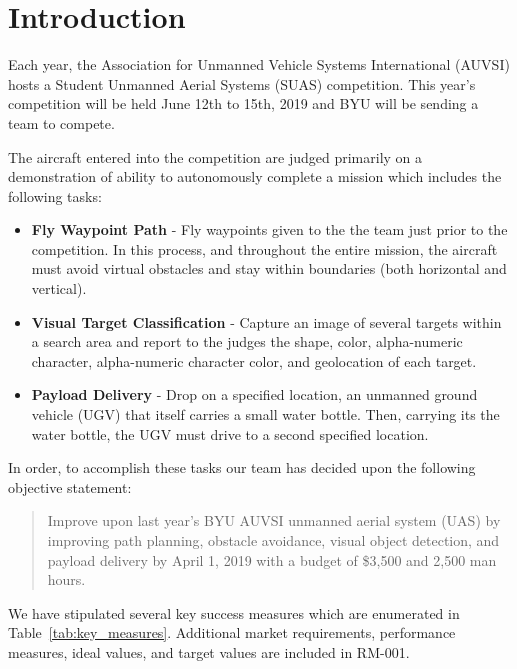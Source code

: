 \documentclass[]{auvsi_doc}
\begin{document}
\begin{AUVSITitlePage}
\begin{artifacttable}
\end{artifacttable}
\end{AUVSITitlePage}


\section{ Introduction}

Each year, the Association for Unmanned Vehicle Systems International (AUVSI) hosts a Student Unmanned Aerial Systems (SUAS) competition. This year’s competition will be held June 12th to 15th, 2019 and BYU will be sending a team to compete.

The aircraft entered into the competition are judged primarily on a demonstration of ability to autonomously complete a mission which includes the following tasks:

\begin{itemize}
	\item\textbf{Fly Waypoint Path} - Fly waypoints given to the the team just prior to the competition. In this process, and throughout the entire mission, the aircraft must avoid virtual obstacles and stay within boundaries (both horizontal and vertical).
	\item\textbf{Visual Target Classification} - Capture an image of several targets within a search area and report to the judges the shape, color, alpha-numeric character, alpha-numeric character color, and geolocation of each target.
	\item\textbf{Payload Delivery} - Drop on a specified location, an unmanned ground vehicle (UGV) that itself carries a small water bottle. Then, carrying its the water bottle, the UGV must drive to a second specified location.
\end{itemize}

In order, to accomplish these tasks our team has decided upon the following objective statement: 
 
\begin{quote}
Improve upon last year’s BYU AUVSI unmanned aerial system (UAS) by improving path planning, obstacle avoidance, visual object detection, and payload delivery by April 1, 2019 with a budget of \$3,500 and 2,500 man hours.
\end{quote}

We have stipulated several key success measures which are enumerated in Table~\ref{tab:key_measures}. Additional market requirements, performance measures, ideal values, and target values are included in RM-001.
\end{document}
